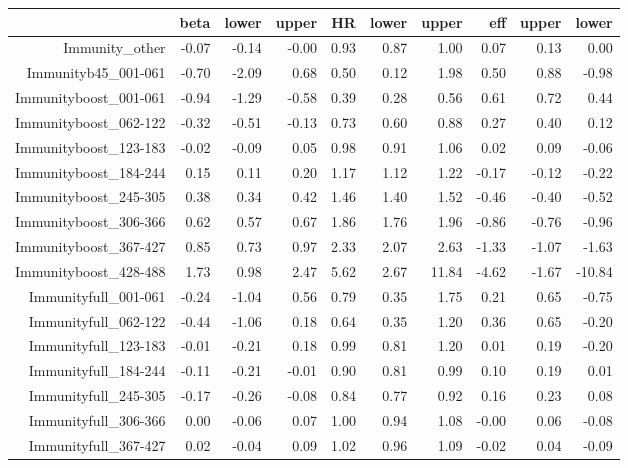 \begin{table}[ht]
\centering
\begin{tabular}{rrrrrrrrrr}
  \hline
 & beta & lower & upper & HR & lower & upper & eff & upper & lower \\ 
  \hline
Immunity\_other & -0.07 & -0.14 & -0.00 & 0.93 & 0.87 & 1.00 & 0.07 & 0.13 & 0.00 \\ 
  Immunityb45\_001-061 & -0.70 & -2.09 & 0.68 & 0.50 & 0.12 & 1.98 & 0.50 & 0.88 & -0.98 \\ 
  Immunityboost\_001-061 & -0.94 & -1.29 & -0.58 & 0.39 & 0.28 & 0.56 & 0.61 & 0.72 & 0.44 \\ 
  Immunityboost\_062-122 & -0.32 & -0.51 & -0.13 & 0.73 & 0.60 & 0.88 & 0.27 & 0.40 & 0.12 \\ 
  Immunityboost\_123-183 & -0.02 & -0.09 & 0.05 & 0.98 & 0.91 & 1.06 & 0.02 & 0.09 & -0.06 \\ 
  Immunityboost\_184-244 & 0.15 & 0.11 & 0.20 & 1.17 & 1.12 & 1.22 & -0.17 & -0.12 & -0.22 \\ 
  Immunityboost\_245-305 & 0.38 & 0.34 & 0.42 & 1.46 & 1.40 & 1.52 & -0.46 & -0.40 & -0.52 \\ 
  Immunityboost\_306-366 & 0.62 & 0.57 & 0.67 & 1.86 & 1.76 & 1.96 & -0.86 & -0.76 & -0.96 \\ 
  Immunityboost\_367-427 & 0.85 & 0.73 & 0.97 & 2.33 & 2.07 & 2.63 & -1.33 & -1.07 & -1.63 \\ 
  Immunityboost\_428-488 & 1.73 & 0.98 & 2.47 & 5.62 & 2.67 & 11.84 & -4.62 & -1.67 & -10.84 \\ 
  Immunityfull\_001-061 & -0.24 & -1.04 & 0.56 & 0.79 & 0.35 & 1.75 & 0.21 & 0.65 & -0.75 \\ 
  Immunityfull\_062-122 & -0.44 & -1.06 & 0.18 & 0.64 & 0.35 & 1.20 & 0.36 & 0.65 & -0.20 \\ 
  Immunityfull\_123-183 & -0.01 & -0.21 & 0.18 & 0.99 & 0.81 & 1.20 & 0.01 & 0.19 & -0.20 \\ 
  Immunityfull\_184-244 & -0.11 & -0.21 & -0.01 & 0.90 & 0.81 & 0.99 & 0.10 & 0.19 & 0.01 \\ 
  Immunityfull\_245-305 & -0.17 & -0.26 & -0.08 & 0.84 & 0.77 & 0.92 & 0.16 & 0.23 & 0.08 \\ 
  Immunityfull\_306-366 & 0.00 & -0.06 & 0.07 & 1.00 & 0.94 & 1.08 & -0.00 & 0.06 & -0.08 \\ 
  Immunityfull\_367-427 & 0.02 & -0.04 & 0.09 & 1.02 & 0.96 & 1.09 & -0.02 & 0.04 & -0.09 \\ 

\end{tabular}
\end{table}
